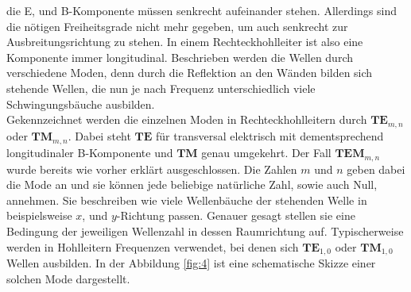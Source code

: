 die E, und B-Komponente müssen senkrecht aufeinander stehen. Allerdings sind die nötigen Freiheitsgrade nicht mehr gegeben, um auch senkrecht zur Ausbreitungsrichtung zu stehen. In einem Rechteckhohlleiter ist also eine Komponente immer
longitudinal. Beschrieben werden die Wellen durch verschiedene Moden, denn durch die Reflektion an den Wänden bilden sich stehende Wellen, die nun je nach Frequenz unterschiedlich viele Schwingungsbäuche ausbilden. 
\\
\newline
Gekennzeichnet werden die einzelnen Moden in Rechteckhohlleitern durch $\textbf{TE}_{m,n}$ oder $\textbf{TM}_{m,n}$. Dabei steht $\textbf{TE}$ für transversal elektrisch mit dementsprechend longitudinaler B-Komponente und $\textbf{TM}$ genau umgekehrt. Der Fall $\textbf{TEM}_{m,n}$ wurde
bereits wie vorher erklärt ausgeschlossen. Die Zahlen $m$ und $n$ geben dabei die Mode an und sie können jede beliebige natürliche Zahl, sowie auch Null, annehmen. Sie beschreiben wie viele Wellenbäuche der stehenden Welle in beispielsweise $x$, und $y$-Richtung passen.
Genauer gesagt stellen sie eine Bedingung der jeweiligen Wellenzahl in dessen Raumrichtung auf. Typischerweise werden in Hohlleitern Frequenzen verwendet, bei denen sich $\textbf{TE}_{1,0}$ oder $\textbf{TM}_{1,0}$ Wellen ausbilden. In der Abbildung \ref{fig:4} ist eine 
schematische Skizze einer solchen Mode dargestellt.


